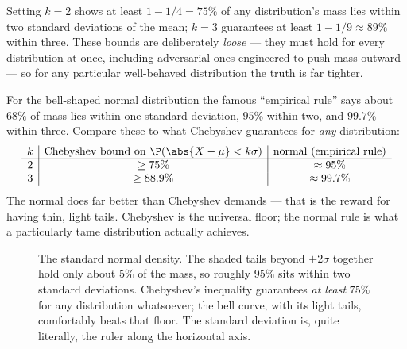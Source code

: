 Setting $k=2$ shows at least $1 - 1/4 = 75\%$ of any distribution's mass lies
within two standard deviations of the mean; $k=3$ guarantees at least
$1 - 1/9 \approx 89\%$ within three. These bounds are deliberately
\emph{loose} --- they must hold for every distribution at once, including
adversarial ones engineered to push mass outward --- so for any particular
well-behaved distribution the truth is far tighter.

\begin{example}
\label{ch09:ex-cheby-vs-normal}
For the bell-shaped normal distribution the famous ``empirical rule'' says
about $68\%$ of mass lies within one standard deviation, $95\%$ within two, and
$99.7\%$ within three. Compare these to what Chebyshev guarantees for
\emph{any} distribution:
\[
  \begin{array}{c|c|c}
    k & \text{Chebyshev bound on } \P(\abs{X-\mu}<k\sigma)
      & \text{normal (empirical rule)}\\\hline
    2 & \ge 75\%   & \approx 95\%\\
    3 & \ge 88.9\% & \approx 99.7\%
  \end{array}
\]
The normal does far better than Chebyshev demands --- that is the reward for
having thin, light tails. Chebyshev is the universal floor; the normal rule is
what a particularly tame distribution actually achieves.
\end{example}

\begin{figure}[H]
\centering
{}
\caption{The standard normal density. The shaded tails beyond $\pm 2\sigma$
together hold only about $5\%$ of the mass, so roughly $95\%$ sits within two
standard deviations. Chebyshev's inequality guarantees \emph{at least} $75\%$
for any distribution whatsoever; the bell curve, with its light tails,
comfortably beats that floor. The standard deviation is, quite literally, the
ruler along the horizontal axis.}
\label{ch09:fig-bell}
\end{figure}

